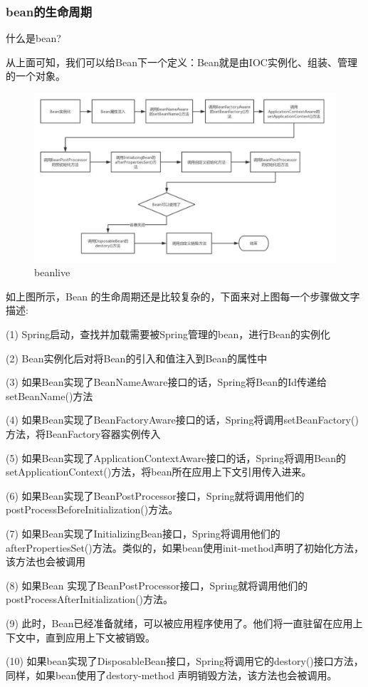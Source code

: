 \documentclass[UTF8]{ctexart}
\begin{document}
\subsubsection{bean的生命周期}
什么是bean? \par
从上面可知，我们可以给Bean下一个定义：Bean就是由IOC实例化、组装、管理的一个对象。
\begin{figure}
	\centering
	\includegraphics[width=0.7\linewidth]{figures/bean_live.jpg}
	\caption{beanlive}
	\label{fig:bean_live}
	
\end{figure}
如上图所示，Bean 的生命周期还是比较复杂的，下面来对上图每一个步骤做文字描述: \par
(1) Spring启动，查找并加载需要被Spring管理的bean，进行Bean的实例化 \par
(2) Bean实例化后对将Bean的引入和值注入到Bean的属性中 \par
(3) 如果Bean实现了BeanNameAware接口的话，Spring将Bean的Id传递给setBeanName()方法 \par
(4) 如果Bean实现了BeanFactoryAware接口的话，Spring将调用setBeanFactory()方法，将BeanFactory容器实例传入 \par
(5) 如果Bean实现了ApplicationContextAware接口的话，Spring将调用Bean的setApplicationContext()方法，将bean所在应用上下文引用传入进来。 \par
(6) 如果Bean实现了BeanPostProcessor接口，Spring就将调用他们的postProcessBeforeInitialization()方法。\par
(7) 如果Bean实现了InitializingBean接口，Spring将调用他们的afterPropertiesSet()方法。类似的，如果bean使用init-method声明了初始化方法，该方法也会被调用 \par

(8) 如果Bean 实现了BeanPostProcessor接口，Spring就将调用他们的postProcessAfterInitialization()方法。\par
(9) 此时，Bean已经准备就绪，可以被应用程序使用了。他们将一直驻留在应用上下文中，直到应用上下文被销毁。\par
(10) 如果bean实现了DisposableBean接口，Spring将调用它的destory()接口方法，同样，如果bean使用了destory-method 声明销毁方法，该方法也会被调用。\par
\end{document}
